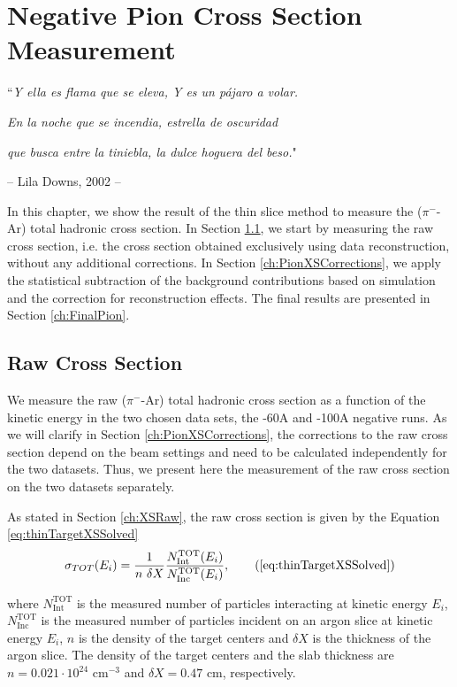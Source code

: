 \chapter{Negative Pion Cross Section Measurement}\label{ch:PionXS}
{\raggedleft ``\emph{Y ella es flama que se eleva, Y es un p\'ajaro a volar.} \par}
{\raggedleft \emph{En la noche que se incendia, estrella de oscuridad}\par}
{\raggedleft \emph{que busca entre la tiniebla, la dulce hoguera del beso.}"\par}
{\raggedleft -- Lila Downs,   2002 -- \par}%
\vspace{0.5cm}

In this chapter, we show the result of the thin slice method to measure 
the ($\pi^-$-Ar) total hadronic cross section. In Section \ref{ch:PionXSRaw}, we start by measuring the raw cross section, i.e. the cross section obtained exclusively using data reconstruction, without any additional corrections. In Section \ref{ch:PionXSCorrections}, we apply the statistical subtraction of the background contributions based on simulation and the correction for reconstruction effects. The final results are presented in Section \ref{ch:FinalPion}.


\section{Raw Cross Section}\label{ch:PionXSRaw}
We measure the raw ($\pi^-$-Ar) total hadronic cross section as a function of the kinetic energy in the two chosen data sets, the -60A and -100A negative runs. 
As we will clarify in Section \ref{ch:PionXSCorrections},  the corrections to the raw cross section depend on the beam settings and need to be calculated independently for the two datasets. Thus, we present here the measurement of the raw cross section on the two datasets separately.


As stated in Section \ref{ch:XSRaw},  the raw cross section is given by the Equation \ref{eq:thinTargetXSSolved}
\begin{equation}
 \sigma_{TOT} (E_i)  = \frac{1}{n\text{ } \delta X}\frac{N^{\text{TOT}}_{\text{Int}}(E_i)}{N^{\text{TOT}}_{\text{Inc}}(E_i)},  \tag{\ref{eq:thinTargetXSSolved}}
\end{equation}

where $N^{\text{TOT}}_{\text{Int}}$  is the measured number of particles interacting at kinetic energy $E_i$, $N^{\text{TOT}}_{\text{Inc}}$ is the  measured  number of particles incident  on an argon slice at  kinetic energy $E_i$,  $n$ is the density of the target centers  and $\delta X$ is the thickness of the argon slice. The density of the target centers and the slab thickness are $n = 0.021\cdot10^{24} \text{ cm}^{-3} $ and  $\delta X=0.47\text{ cm}$, respectively.


